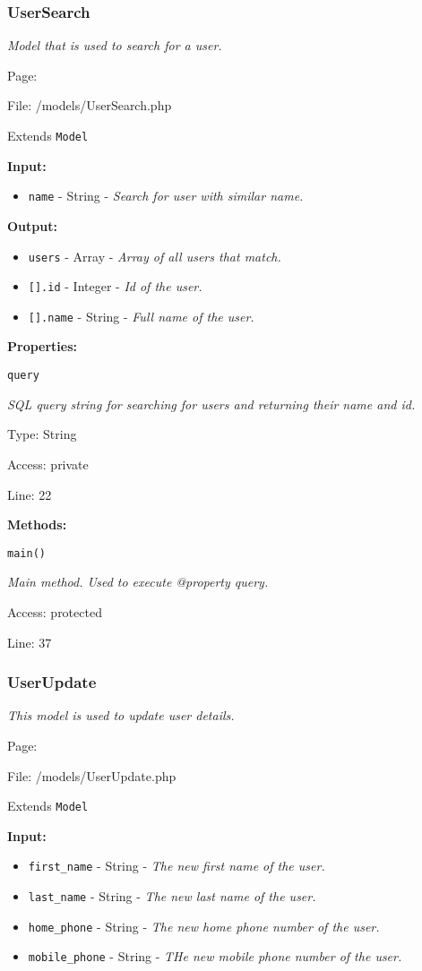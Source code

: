 \subsubsection{UserSearch}\label{UserSearch.php.doc}
\textit{Model that is used to search for a user.}

Page: \pageref{UserSearch.php}

File: /models/UserSearch.php

Extends \texttt{Model}

\textbf{Input:}
\begin{itemize}
\item \texttt{name} - String - \textit{Search for user with similar name.}
\end{itemize}

\textbf{Output:}
\begin{itemize}
\item \texttt{users} - Array - \textit{Array of all users that match.}
\item \texttt{[].id} - Integer - \textit{Id of the user.}
\item \texttt{[].name} - String - \textit{Full name of the user.}
\end{itemize}

\textbf{Properties:}

\texttt{query}

{\scriptsize
\textit{SQL query string for searching for users and returning their name and id.}

Type: String

Access: private

Line: 22

}
\textbf{Methods:}

\texttt{main()}

{\scriptsize
\textit{Main method.
Used to execute @property query.}

Access: protected

Line: 37

}

\subsubsection{UserUpdate}\label{UserUpdate.php.doc}
\textit{This model is used to update user details.}

Page: \pageref{UserUpdate.php}

File: /models/UserUpdate.php

Extends \texttt{Model}

\textbf{Input:}
\begin{itemize}
\item \texttt{first\_name} - String - \textit{The new first name of the user.}
\item \texttt{last\_name} - String - \textit{The new last name of the user.}
\item \texttt{home\_phone} - String - \textit{The new home phone number of the user.}
\item \texttt{mobile\_phone} - String - \textit{THe new mobile phone number of the user.}
\end{itemize}

